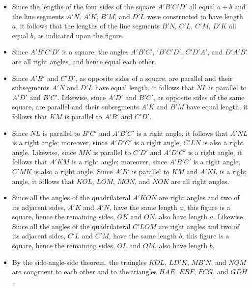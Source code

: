 \documentclass[12pt]{article}
\begin{document}
\begin{itemize}
\item  Since the lengths of the four sides of the square $A'B'C'D'$ all equal $a+b$
and the line segments $A'N$, $A'K$, $B'M$, and $D'L$ were constructed to have length
$a$, it follows that the lengths of the line segments $B'N$, $C'L$, $C'M$, $D'K$ all
equal $b$, as indicated upon the figure.
\item  Since $A'B'C'D'$ is a square, the angles $A'B'C'$, $'B'C'D'$, $C'D'A'$, and 
$D'A'B'$ are all right angles, and hence equal each other.
\item Since $A'B'$ and $C'D'$, as opposite sides of a square, are parallel and their
subsegments $A'N$ and $D'L$ have equal length, it follows that $NL$ is parallel to
$A'D'$ and $B'C'$.  Likewise, since $A'D'$ and $B'C'$, as opposite sides of the
same square, are parallel and their subsegments $A'K$ and $B'M$ have equal length,
it follows that $KM$ is parallel to $A'B'$ and $C'D'$.
\item Since $NL$ is parallel to $B'C'$ and $A'B'C'$ is a right angle, it follows
that $A'NL$ is a right angle; moreover, since $A'D'C'$ is a right angle, $C'LN$ is
also a right angle.  Likewise, since $MK$ is parallel to $C'D'$ and $A'D'C'$ is a 
right angle, it follows that $A'KM$ is a right angle; moreover, since $A'B'C'$ is 
a right angle, $C'MK$ is also a right angle.  Since $A'B'$ is parallel to $KM$ and
$A'NL$ is a right angle, it follows that $KOL$, $LOM$, $MON$, and $NOK$ are all
right angles.
\item  Since all the angles of the quadrilateral $A'KON$ are right angles and two
of its adjacent sides, $A'K$ and $A'N$, have the same length $a$, this figure is a
square, hence the remaining sides, $OK$ and $ON$, also have length $a$.  Likewise,
Since all the angles of the quadrilateral $C'LOM$ are right angles and two
of its adjacent sides, $C'L$ and $C'M$, have the same length $b$, this figure is a
square, hence the remaining sides, $OL$ and $OM$, also have length $b$.
\item By the side-angle-side theorem, the traingles $KOL$, $LD'K$, $MB'N$, and
$NOM$ are congruent to each other and to the triangles $HAE$, $EBF$, $FCG$, and
$GDH$.
\end{itemize}
\end{document}
